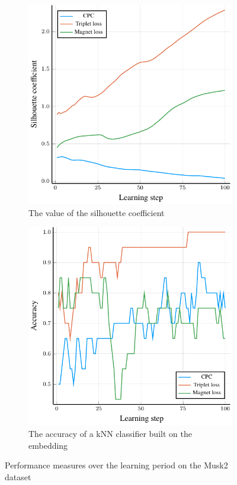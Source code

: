 \documentclass[a4paper]{llncs}
\begin{document}
\begin{figure}
	\begin{subfigure}[t]{0.49\textwidth}
		\centering
		\includegraphics[width=\textwidth]{images/musk2-ratio/musk2-ratio.pdf}
		\caption{The value of the silhouette coefficient}
	\end{subfigure}
	\begin{subfigure}[t]{0.49\textwidth}
		\centering
		\includegraphics[width=\textwidth]{images/musk2-accuracy/musk2-accuracy.pdf}
		\caption{The accuracy of a kNN classifier built on the embedding}
	\end{subfigure}
	\caption{Performance measures over the learning period on the Musk2 dataset\cite{dietterich_solving_1997}}\label{fig:musk2}
\end{figure}
\end{document}
